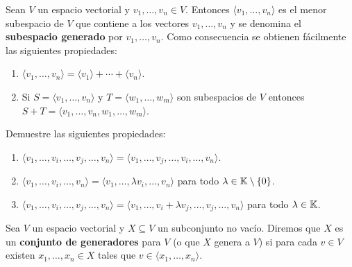 \begin{block}
    Sean $V$ un espacio vectorial y $v_1,\dots,v_n\in V$. Entonces $\langle
    v_1,\dots,v_n\rangle$ es el menor subespacio de $V$ que contiene a los
    vectores $v_1,\dots,v_n$ y se denomina el \textbf{subespacio generado} por
	$v_1,\dots,v_n$. Como consecuencia se obtienen fácilmente las siguientes
	propiedades:
	\begin{enumerate}
		\item $\langle v_1,\dots,v_n\rangle=\langle v_1\rangle+\cdots+\langle
			v_n\rangle$.
        \item Si $S=\langle v_1,\dots,v_n\rangle$ y $T=\langle
            w_1,\dots,w_m\rangle$ son subespacios de $V$ entonces
            $S+T=\langle v_1,\dots,v_n,w_1,\dots,w_m\rangle$.
	\end{enumerate}
\end{block}

\begin{xca}
    Demuestre las siguientes propiedades:
    \begin{enumerate}
        \item $\langle v_1,\dots,v_i,\dots,v_j,\dots,v_n\rangle= 
            \langle v_1,\dots,v_j,\dots,v_i,\dots,v_n\rangle$.
        \item $\langle v_1,\dots,v_i,\dots,v_n\rangle=\langle v_1,\dots,\lambda
            v_i,\dots,v_n\rangle$ para todo $\lambda\in\mathbb{K}\setminus\{0\}$.
        \item $\langle v_1,\dots,v_i,\dots,v_j,\dots,v_n\rangle=
            \langle v_1,\dots,v_i+\lambda v_j,\dots,v_j,\dots,v_n\rangle$
            para todo $\lambda\in\mathbb{K}$.
    \end{enumerate}
\end{xca}

\begin{block}
	Sea $V$ un espacio vectorial y $X\subseteq V$ un subconjunto no vacío.
	Diremos que $X$ es un \textbf{conjunto de generadores} para $V$ (o que $X$
	genera a $V$) si para cada $v\in V$ existen $x_1,\dots,x_n\in X$ tales que
	$v\in\langle x_1,\dots,x_n\rangle$.
\end{block}


